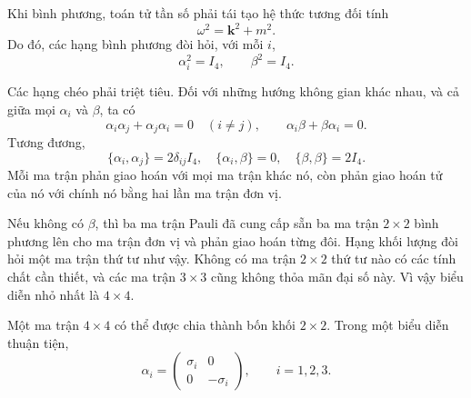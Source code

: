 \begin{classroomqa}
\end{classroomqa}

Khi bình phương, toán tử tần số phải tái tạo hệ thức tương đối tính
\begin{equation}
\omega^2=\mathbf{k}^2+m^2.
\end{equation}
Do đó, các hạng bình phương đòi hỏi, với mỗi \(i\),
\begin{equation}
\alpha_i^2=I_4,
\qquad
\beta^2=I_4.
\end{equation}

\begin{classroomqa}
\end{classroomqa}

Các hạng chéo phải triệt tiêu. Đối với những hướng không gian khác nhau, và cả giữa mọi \(\alpha_i\) và \(\beta\), ta có
\begin{equation}
\alpha_i\alpha_j+\alpha_j\alpha_i=0
\quad (i\neq j),
\qquad
\alpha_i\beta+\beta\alpha_i=0.
\end{equation}
Tương đương,
\begin{equation}
\{\alpha_i,\alpha_j\}=2\delta_{ij}I_4,
\quad
\{\alpha_i,\beta\}=0,
\quad
\{\beta,\beta\}=2I_4.
\end{equation}
Mỗi ma trận phản giao hoán với mọi ma trận khác nó, còn phản giao hoán tử của nó với chính nó bằng hai lần ma trận đơn vị.

Nếu không có \(\beta\), thì ba ma trận Pauli đã cung cấp sẵn ba ma trận \(2\times2\) bình phương lên cho ma trận đơn vị và phản giao hoán từng đôi. Hạng khối lượng đòi hỏi một ma trận thứ tư như vậy. Không có ma trận \(2\times2\) thứ tư nào có các tính chất cần thiết, và các ma trận \(3\times3\) cũng không thỏa mãn đại số này. Vì vậy biểu diễn nhỏ nhất là \(4\times4\).

Một ma trận \(4\times4\) có thể được chia thành bốn khối \(2\times2\). Trong một biểu diễn thuận tiện,
\begin{equation}
\alpha_i=
\begin{pmatrix}
\sigma_i&0\\
0&-\sigma_i
\end{pmatrix},
\qquad i=1,2,3.
\end{equation}

